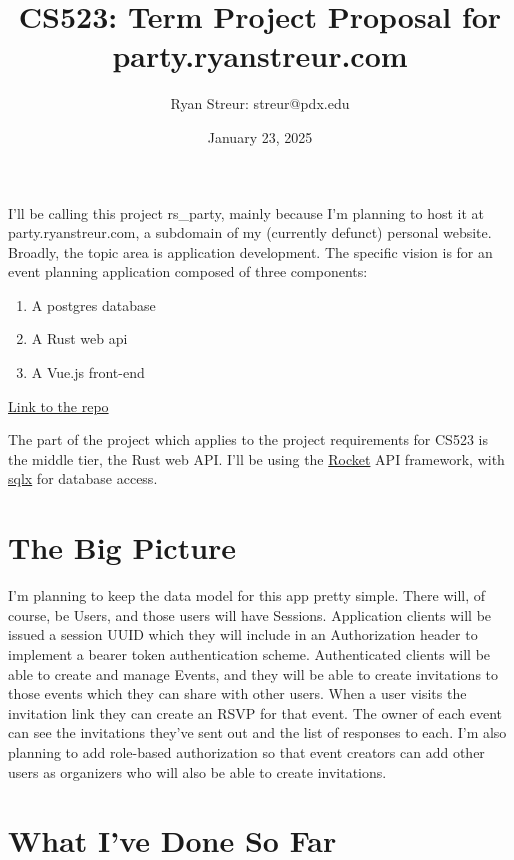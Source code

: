 \documentclass{article}
\title{CS523: Term Project Proposal for party.ryanstreur.com}
\author{Ryan Streur: streur@pdx.edu}
\date{January 23, 2025}
\begin{document}
  \maketitle 

  I'll be calling this project rs\_party, mainly because I'm planning to host it at party.ryanstreur.com, a subdomain of my (currently defunct) personal website. Broadly, the topic area is application development. The specific vision is for an event planning application composed of three components:

  \begin{enumerate}
    \item A postgres database
    \item A Rust web api
    \item A Vue.js front-end
  \end{enumerate}

  \href{https://gitlab.cecs.pdx.edu/streur/rs_party}{Link to the repo}

  The part of the project which applies to the project requirements for CS523 is the middle tier, the Rust web API. I'll be using the \href{https://rocket.rs/}{Rocket} API framework, with \href{https://docs.rs/sqlx/latest/sqlx/}{sqlx} for database access.

  \section{The Big Picture}

  I'm planning to keep the data model for this app pretty simple. There will, of course, be Users, and those users will have Sessions. Application clients will be issued a session UUID which they will include in an Authorization header to implement a bearer token authentication scheme.  Authenticated clients will be able to create and manage Events, and they will be able to create invitations to those events which they can share with other users. When a user visits the invitation link they can create an RSVP for that event. The owner of each event can see the invitations they've sent out and the list of responses to each. I'm also planning to add role-based authorization so that event creators can add other users as organizers who will also be able to create invitations.

  \section{What I've Done So Far}
\end{document}
